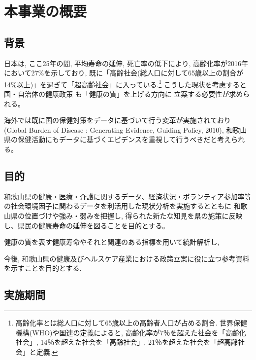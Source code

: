 



\chapter{本事業の概要}
\section{背景}
日本は, ここ25年の間, 平均寿命の延伸, 死亡率の低下により, 高齢化率が2016年において27\%を示しており, 既に「高齢社会(総人口に対して65歳以上の割合が14\%以上)」を過ぎて「超高齢社会」に入っている.\footnote{
	高齢化率とは総人口に対して65歳以上の高齢者人口が占める割合. 世界保健機構(WHO)や国連の定義によると, 高齢化率が7％を超えた社会を「高齢化社会」, 14％を超えた社会を「高齢社会」, 21％を超えた社会を「超高齢社会」と定義.
}
こうした現状を考慮すると
国・自治体の健康政策
も「健康の質」を上げる方向に
立案する必要性が求められる。


海外では既に国の保健対策をデータに基づいて行う変革が実施されており(Global Burden of Disease :  Generating Evidence, Guiding Policy, 2010),
和歌山県の保健活動にもデータに基づくエビデンスを重視して行うべきだと考えられる。


\section{目的}
和歌山県の健康・医療・介護に関するデータ、経済状況・ボランティア参加率等の社会環境因子に関わるデータを利活用した現状分析を実施するとともに
和歌山県の位置づけや強み・弱みを把握し,
得られた新たな知見を県の施策に反映し、県民の健康寿命の延伸を図ることを目的とする。




健康の質を表す健康寿命やそれと関連のある指標を用いて統計解析し,

 今後, 和歌山県の健康及びヘルスケア産業における政策立案に役に立つ参考資料を示すことを目的とする.

\section{実施期間}


